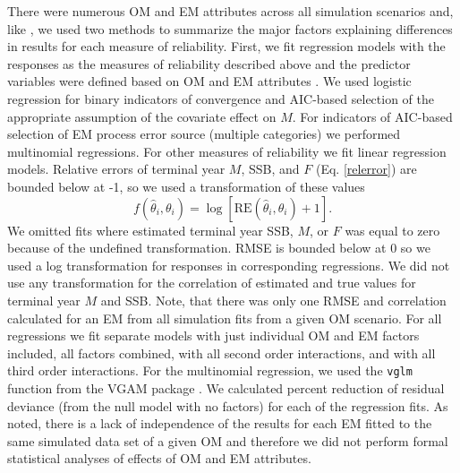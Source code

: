 \documentclass[
  12pt,
]{article}
\begin{document}
There were numerous OM and EM attributes across all simulation scenarios and, like \citet{milleretal_inreview1}, we used two methods to summarize the major factors explaining differences in results for each measure of reliability. First, we fit regression models with the responses as the measures of reliability described above and the predictor variables were defined based on OM and EM attributes \citep[e.g.,][]{mackinnonetal95, wangetal17, harwelletal18}. We used logistic regression for binary indicators of convergence and AIC-based selection of the appropriate assumption of the covariate effect on \(M\). For indicators of AIC-based selection of EM process error source (multiple categories) we performed multinomial regressions. For other measures of reliability we fit linear regression models. Relative errors of terminal year \(M\), SSB, and \(F\) (Eq. \ref{relerror}) are bounded below at -1, so we used a transformation of these values
\begin{equation}\label{relerror_trans_response}
f\left(\widehat \theta_i,\theta_i\right)  = \log\left[\text{RE}\left(\widehat \theta_i,\theta_i\right)+1\right].
\end{equation}
We omitted fits where estimated terminal year SSB, \(M\), or \(F\) was equal to zero because of the undefined transformation. RMSE is bounded below at 0 so we used a log transformation for responses in corresponding regressions. We did not use any transformation for the correlation of estimated and true values for terminal year \(M\) and SSB. Note, that there was only one RMSE and correlation calculated for an EM from all simulation fits from a given OM scenario. For all regressions we fit separate models with just individual OM and EM factors included, all factors combined, with all second order interactions, and with all third order interactions. For the multinomial regression, we used the \verb|vglm| function from the VGAM package \citep{yee08, yee15}. We calculated percent reduction of residual deviance (from the null model with no factors) for each of the regression fits. As \citet{milleretal_inreview1} noted, there is a lack of independence of the results for each EM fitted to the same simulated data set of a given OM and therefore we did not perform formal statistical analyses of effects of OM and EM attributes.
\end{document}
